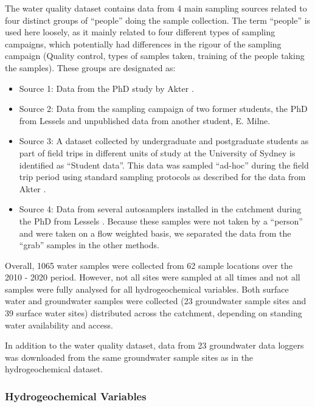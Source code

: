 \documentclass[, manuscript]{copernicus}
\begin{document}
The water quality dataset contains data from 4 main sampling sources
related to four distinct groups of ``people'' doing the sample
collection. The term ``people'' is used here loosely, as it mainly
related to four different types of sampling campaigns, which potentially
had differences in the rigour of the sampling campaign (Quality control,
types of samples taken, training of the people taking the samples).
These groups are designated as:

\begin{itemize}
\item
  Source 1: Data from the PhD study by Akter \citeyearpar{Akter2018}.
\item
  Source 2: Data from the sampling campaign of two former students, the
  PhD from Lessels \citeyearpar{Lessels2014} and unpublished data from
  another student, E. Milne.
\item
  Source 3: A dataset collected by undergraduate and postgraduate
  students as part of field trips in different units of study at the
  University of Sydney is identified as ``Student data''. This data was
  sampled ``ad-hoc'' during the field trip period using standard
  sampling protocols as described for the data from Akter
  \citeyearpar{Akter2018}.
\item
  Source 4: Data from several autosamplers installed in the catchment
  during the PhD from Lessels \citeyearpar{Lessels2014}. Because these
  samples were not taken by a ``person'' and were taken on a flow
  weighted basis, we separated the data from the ``grab'' samples in the
  other methods.
\end{itemize}

Overall, 1065 water samples were collected from 62 sample locations over
the 2010 - 2020 period. However, not all sites were sampled at all times
and not all samples were fully analysed for all hydrogeochemical
variables. Both surface water and groundwater samples were collected (23
groundwater sample sites and 39 surface water sites) distributed across
the catchment, depending on standing water availability and access.

In addition to the water quality dataset, data from 23 groundwater data
loggers was downloaded from the same groundwater sample sites as in the
hydrogeochemical dataset.

\subsubsection{Hydrogeochemical Variables}
\end{document}
